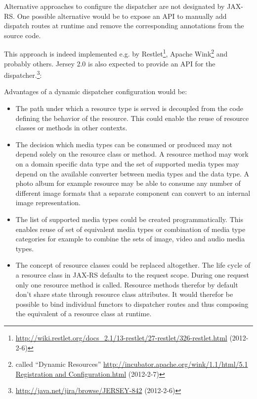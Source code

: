 \documentclass[12pt,a4paper,twoside]{scrartcl}		%
\newcommand{\citeurl}[2]{\url{#1} (#2)}
\begin{document}
Alternative approaches to configure the dispatcher are not designated by
JAX-RS. One possible alternative would be to expose an API to manually add
dispatch routes at runtime and remove the corresponding annotations from the
source code. 

This approach is indeed implemented e.g. by
Restlet\footnote{\citeurl{http://wiki.restlet.org/docs_2.1/13-restlet/27-restlet/326-restlet.html}{2012-2-6}},
Apache Wink\footnote{called ``Dynamic Resources''
  \citeurl{http://incubator.apache.org/wink/1.1/html/5.1 Registration and
    Configuration.html}{2012-2-7}} and probably others. Jersey 2.0 is also
expected to provide an API for the
dispatcher.\footnote{\citeurl{http://java.net/jira/browse/JERSEY-842}{2012-2-6}}:

Advantages of a dynamic dispatcher configuration would be:


\begin{itemize}
\item The path under which a resource type is served is decoupled from the code
  defining the behavior of the resource. This could enable the reuse of resource
  classes or methods in other contexts.
\item The decision which media types can be consumed or produced may not depend
  solely on the resource class or method. A resource method may work on a domain
  specific data type and the set of supported media types may depend on the
  available converter between media types and the data type. A photo album for example
  resource may be able to consume any number of different image formats that
  a separate component can convert to an internal image representation.
\item The list of supported media types could be created programmatically. This
  enables reuse of set of equivalent media types or combination of media type
  categories for example to combine the sets of image, video and audio media
  types.
\item The concept of resource classes could be replaced altogether. The life
  cycle of a resource class in JAX-RS defaults to the request scope. During one
  request only one resource method is called. Resource methods therefor by
  default don't share state through resource class attributes. It would therefor
  be possible to bind individual functors to dispatcher routes and thus
  composing the equivalent of a resource class at runtime.
\end{itemize}
\end{document}
